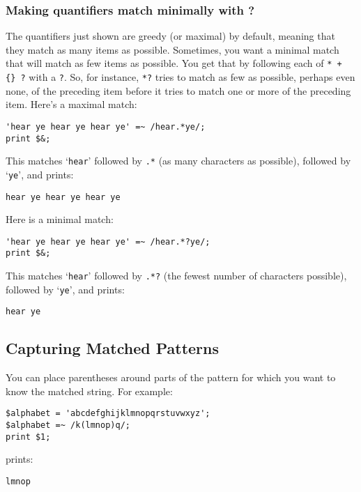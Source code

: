 \subsubsection{Making quantifiers match minimally with ?}
The quantifiers just shown are greedy (or maximal) by default, meaning that they match as many items as possible. Sometimes, you want a minimal match that will match as few items as possible. You get that by following each of \verb|* + {} ?| with a \verb|?|. So, for instance, \verb|*?| tries to match as few as possible, perhaps even none, of the preceding item before it tries to match one or more of the preceding item. Here's a maximal match:

\begin{lstlisting}
'hear ye hear ye hear ye' =~ /hear.*ye/;
print $&;
\end{lstlisting}

This matches `\verb|hear|' followed by \verb|.*| (as many characters as possible), followed by `\verb|ye|', and prints:

\begin{lstlisting}
hear ye hear ye hear ye
\end{lstlisting}

Here is a minimal match:

\begin{lstlisting}
'hear ye hear ye hear ye' =~ /hear.*?ye/;
print $&;
\end{lstlisting}

This matches `\verb|hear|' followed by \verb|.*?| (the fewest number of characters possible), followed by `\verb|ye|', and prints:

\begin{lstlisting}
hear ye
\end{lstlisting}

\subsection{Capturing Matched Patterns}
You can place parentheses around parts of the pattern for which you want to know the matched string. For example:

\begin{lstlisting}
$alphabet = 'abcdefghijklmnopqrstuvwxyz';
$alphabet =~ /k(lmnop)q/;
print $1;
\end{lstlisting}

prints:

\begin{lstlisting}
lmnop
\end{lstlisting}

